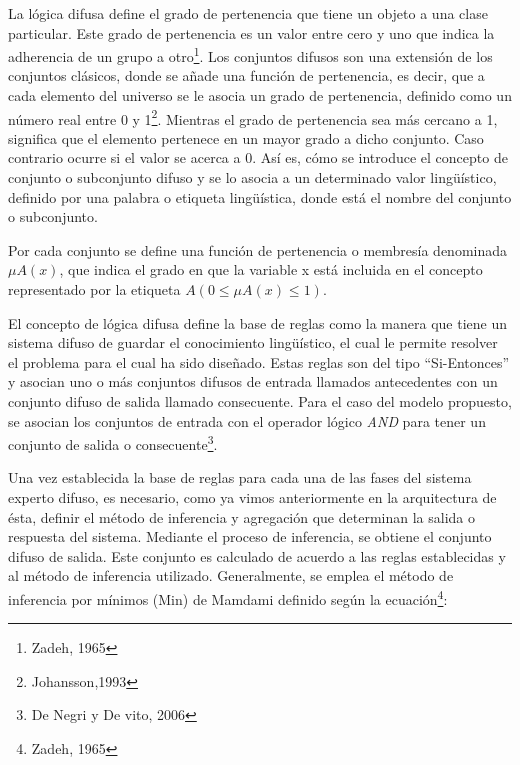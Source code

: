 \documentclass[a4paper, 11pt, titlepage]{article}
\begin{document}
        La lógica difusa define el grado de pertenencia que tiene un 
        objeto a una clase particular. Este grado de pertenencia es un valor entre cero y uno que 
        indica la adherencia de un grupo a otro\footnote{
            Zadeh, 1965
        }. Los conjuntos difusos son una extensión 
        de los conjuntos clásicos, donde se añade una función de pertenencia, es decir, que a cada 
        elemento del universo se le asocia un grado de pertenencia, definido como un número real entre 
        0 y 1\footnote{
            Johansson,1993
        }. Mientras el grado de pertenencia sea más cercano a 1, significa que el 
        elemento pertenece en un mayor grado a dicho conjunto. Caso contrario ocurre si el valor se 
        acerca a 0. Así es, cómo se introduce el concepto de conjunto o subconjunto difuso y se lo 
        asocia a un determinado valor lingüístico, definido por una palabra o etiqueta lingüística, 
        donde está el nombre del conjunto o subconjunto. 
        
        Por cada conjunto se define una función de 
        pertenencia o membresía denominada $\mu A(x)$, que indica el grado en que la variable x está incluida 
        en el concepto representado por la etiqueta $A (0 \leq \mu A(x) \leq 1)$. 

        El concepto de lógica difusa define la base de reglas como la manera que tiene un sistema difuso 
        de guardar el conocimiento lingüístico, el cual le permite resolver el problema para el cual ha 
        sido diseñado. Estas reglas son del tipo “Si-Entonces” y asocian uno o más conjuntos difusos de 
        entrada llamados antecedentes con un conjunto difuso de salida llamado consecuente. Para el caso 
        del modelo propuesto, se asocian los conjuntos de entrada con el operador lógico \textit{AND} para tener 
        un conjunto de salida o consecuente\footnote{
            De Negri y De vito, 2006
        }.

        Una vez establecida la base de reglas para cada una de las fases del sistema experto difuso, 
        es necesario, como ya vimos anteriormente en la arquitectura de ésta, definir el método de 
        inferencia y agregación que determinan la salida o respuesta del sistema. Mediante el proceso de 
        inferencia, se obtiene el conjunto difuso de salida. Este conjunto es calculado de acuerdo a las
        reglas establecidas y al método de inferencia utilizado. Generalmente, se emplea el método de 
        inferencia por mínimos (Min) de Mamdami definido según la ecuación\footnote{
            Zadeh, 1965
        }:
\end{document}
